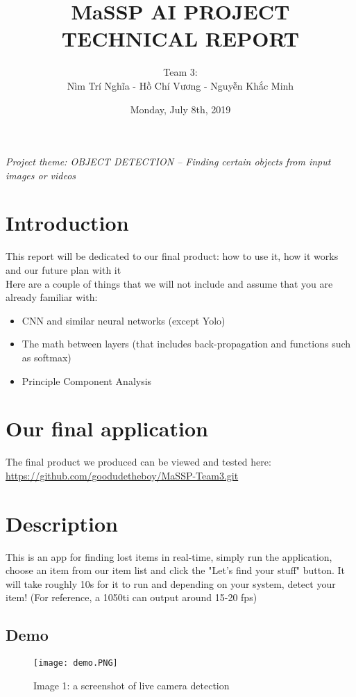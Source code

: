 \documentclass{article}
\title{\textbf{MaSSP AI PROJECT TECHNICAL REPORT}}
\author{Team 3:\\
Nìm Trí Nghĩa - Hồ Chí Vương - Nguyễn Khắc Minh}
\date{Monday, July 8th, 2019}
\begin{document}
\maketitle
\newpage
\tableofcontents
\newpage
\textit{Project theme: OBJECT DETECTION – Finding certain objects from input images or videos} 
\graphicspath{ {./images/} }

\section{Introduction}
\tab This report will be dedicated to our final product: how to use it, how it works and our future plan with it\\
\tab Here are a couple of things that we will not include and assume that you are already familiar with:
\begin{itemize}
	\item CNN and similar neural networks (except Yolo)
	\item The math between layers (that includes back-propagation and functions such as softmax)
	\item Principle Component Analysis
	
\end{itemize}


\section{Our final application}
\tab The final product we produced can be viewed and tested here: \url{https://github.com/goodudetheboy/MaSSP-Team3.git}

\section{Description}
\tab This is an app for finding lost items in real-time, simply run the application, choose an item from our item list and click the "Let's find your stuff" button. It will take roughly 10s for it to run and depending on your system, detect your item! (For reference, a 1050ti can output around 15-20 fps)

\newpage
\subsection{Demo}
\begin{figure}[h!]
	\centerline{\texttt{[image: demo.PNG]}}
	\caption*{Image 1: a screenshot of live camera detection}
\end{figure}
\end{document}
